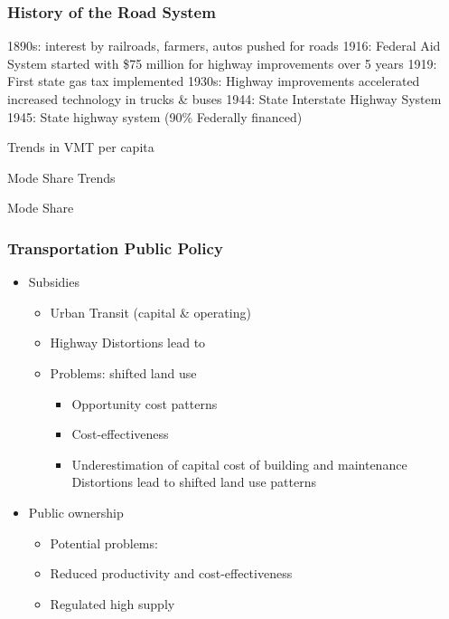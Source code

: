 \documentclass[]{article}
\providecommand{\tightlist}{%
  \setlength{\itemsep}{0pt}\setlength{\parskip}{0pt}}
\begin{document}
\hypertarget{history-of-the-road-system}{%
\subsubsection{History of the Road
System}\label{history-of-the-road-system}}

1890s: interest by railroads, farmers, autos pushed for roads 1916:
Federal Aid System started with \$75 million for highway improvements
over 5 years 1919: First state gas tax implemented 1930s: Highway
improvements accelerated increased technology in trucks \& buses 1944:
State Interstate Highway System 1945: State highway system (90\%
Federally financed)

Trends in VMT per capita

Mode Share Trends

Mode Share

\hypertarget{transportation-public-policy}{%
\subsubsection{Transportation Public
Policy}\label{transportation-public-policy}}

\begin{itemize}
\tightlist
\item
  Subsidies

  \begin{itemize}
  \tightlist
  \item
    Urban Transit (capital \& operating)
  \item
    Highway Distortions lead to
  \item
    Problems: shifted land use

    \begin{itemize}
    \tightlist
    \item
      Opportunity cost patterns
    \item
      Cost-effectiveness
    \item
      Underestimation of capital cost of building and maintenance
      Distortions lead to shifted land use patterns
    \end{itemize}
  \end{itemize}
\item
  Public ownership

  \begin{itemize}
  \tightlist
  \item
    Potential problems:
  \item
    Reduced productivity and cost-effectiveness
  \item
    Regulated high supply
  \end{itemize}
\end{itemize}
\end{document}
